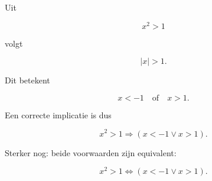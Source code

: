\documentclass{ximera}
\begin{document}
\begin{oefening}{\oefG}
\begin{question}
\begin{oplossing}

Uit

\[
x^2>1
\]

volgt

\[
|x|>1.
\]

Dit betekent

\[
x<-1\quad\text{of}\quad x>1.
\]

Een correcte implicatie is dus

\[
x^2>1
\Rightarrow
(x<-1\lor x>1).
\]

Sterker nog: beide voorwaarden zijn equivalent:

\[
x^2>1
\Leftrightarrow
(x<-1\lor x>1).
\]

\end{oplossing}

\end{question}

\end{oefening}


\end{document}
